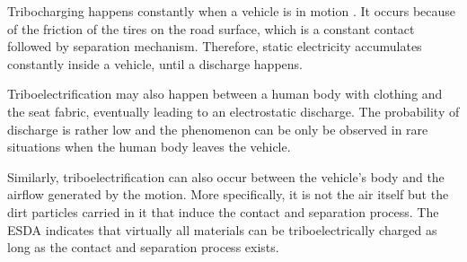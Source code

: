 Tribocharging happens constantly when a vehicle is in motion \cite{generationESDautomotive}.
It occurs because of the friction of the tires on the road surface, which is a constant contact followed by separation mechanism.
Therefore, static electricity accumulates constantly inside a vehicle, until a discharge happens.

Triboelectrification may also happen between a human body with clothing and the seat fabric, eventually leading to an electrostatic discharge.
The probability of discharge is rather low \cite{generationESDautomotive} and the phenomenon can be only be observed in rare situations when the human body leaves the vehicle.

Similarly, triboelectrification can also occur between the vehicle's body and the airflow generated by the motion.
More specifically, it is not the air itself but the dirt particles carried in it that induce the contact and separation process.
The ESDA indicates that virtually all materials can be triboelectrically charged \cite{esda-triboseries} as long as the contact and separation process exists.
